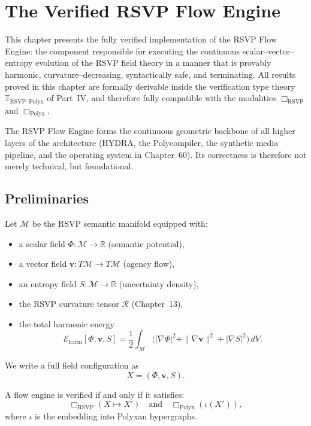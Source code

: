 \chapter{The Verified RSVP Flow Engine}
\label{ch:74}

This chapter presents the fully verified implementation of the RSVP Flow Engine:
the component responsible for executing the continuous
scalar–vector–entropy evolution of the RSVP field theory in a manner that is
provably harmonic, curvature–decreasing, syntactically safe, and
terminating.  
All results proved in this chapter are formally derivable inside the
verification type theory $\mathbb{T}_{\mathrm{RSVP\text{--}Polyx}}$ of
Part~IV, and therefore fully compatible with the modalities
$\Box_{\mathrm{RSVP}}$ and $\Box_{\mathrm{Polyx}}$.

The RSV​P Flow Engine forms the continuous geometric backbone of all higher
layers of the architecture (HYDRA, the Polycompiler, the synthetic media
pipeline, and the operating system in Chapter~60).  
Its correctness is therefore not merely technical, but foundational.

\section{Preliminaries}

Let $\mathcal{M}$ be the RSVP semantic manifold equipped with:
\begin{itemize}
\item a scalar field $\Phi:\mathcal{M}\to\mathbb{R}$ (semantic potential),
\item a vector field $\mathbf{v}:T\mathcal{M}\to T\mathcal{M}$ (agency flow),
\item an entropy field $S:\mathcal{M}\to\mathbb{R}$ (uncertainty density),
\item the RSVP curvature tensor $\mathcal{R}$ (Chapter~13),
\item the total harmonic energy
\[
\mathcal{E}_{\mathrm{harm}}[\Phi,\mathbf{v},S]
= \frac{1}{2}
  \int_{\mathcal{M}}
    \big(|\nabla\Phi|^{2} + \|\nabla\mathbf{v}\|^2 + |\nabla S|^2\big)\,dV.
\]
\end{itemize}

We write a full field configuration as
\[
X = (\Phi,\mathbf{v},S).
\]

A flow engine is verified if and only if it satisfies:
\[
\Box_{\mathrm{RSVP}}(X\mapsto X')
\quad\text{and}\quad
\Box_{\mathrm{Polyx}}(\iota(X')),
\]
where $\iota$ is the embedding into Polyxan hypergraphs.


